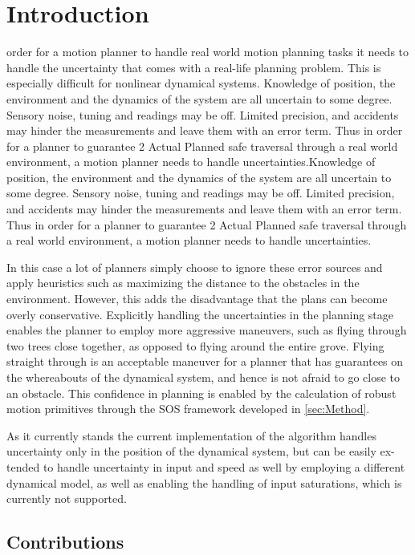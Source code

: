 
\section{Introduction}
 order for a motion planner to handle real world motion
planning tasks it needs to handle the uncertainty that comes with a real-life
planning problem. This is especially difficult for nonlinear dynamical systems.
Knowledge of position, the environment and the dynamics of the system are all
uncertain to some degree. Sensory noise, tuning and readings may be off. Limited
precision, and accidents may hinder the measurements and leave them with an
error term. Thus in order for a planner to guarantee 2 Actual Planned safe
traversal through a real world environment, a motion planner needs to handle
uncertainties.Knowledge of position, the environment and the dynamics of the
system are all uncertain to some degree. Sensory noise, tuning and readings may
be off. Limited precision, and accidents may hinder the measurements and leave
them with an error term. Thus in order for a planner to guarantee 2 Actual
Planned safe traversal through a real world environment, a motion planner needs
to handle uncertainties.

In this case a lot of planners simply choose to ignore these error sources and
apply heuristics such as maximizing the distance to the obstacles in the
environment. However, this adds the disadvantage that the plans can become
overly conservative. Explicitly handling the uncertainties in the planning stage
enables the planner to employ more aggressive maneuvers, such as flying through
two trees close together, as opposed to flying around the entire grove. Flying
straight through is an acceptable maneuver for a planner that has guarantees on
the whereabouts of the dynamical system, and hence is not afraid to go close to
an obstacle. This confidence in planning is enabled by the calculation of robust
motion primitives through the SOS framework developed in \cref{sec:Method}.

As it currently stands the current implementation of the algorithm handles
uncertainty only in the position of the dynamical system, but can be easily ex-
tended to handle uncertainty in input and speed as well by employing a different
dynamical model, as well as enabling the handling of input saturations, which is
currently not supported.


\subsection{Contributions}

